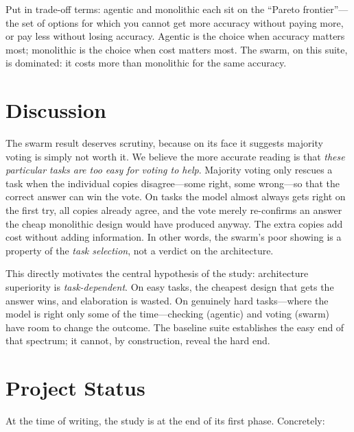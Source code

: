 \documentclass[sigconf,nonacm]{acmart}
\begin{document}
Put in trade-off terms: agentic and monolithic each sit on the ``Pareto
frontier''---the set of options for which you cannot get more accuracy without
paying more, or pay less without losing accuracy. Agentic is the choice when
accuracy matters most; monolithic is the choice when cost matters most. The swarm,
on this suite, is dominated: it costs more than monolithic for the same accuracy.

\section{Discussion}
\label{sec:discussion}

The swarm result deserves scrutiny, because on its face it suggests majority
voting is simply not worth it. We believe the more accurate reading is that
\emph{these particular tasks are too easy for voting to help}. Majority voting
only rescues a task when the individual copies disagree---some right, some
wrong---so that the correct answer can win the vote. On tasks the model almost
always gets right on the first try, all copies already agree, and the vote merely
re-confirms an answer the cheap monolithic design would have produced anyway. The
extra copies add cost without adding information. In other words, the swarm's poor
showing is a property of the \emph{task selection}, not a verdict on the
architecture.

This directly motivates the central hypothesis of the study: architecture
superiority is \emph{task-dependent}. On easy tasks, the cheapest design that
gets the answer wins, and elaboration is wasted. On genuinely hard tasks---where
the model is right only some of the time---checking (agentic) and voting (swarm)
have room to change the outcome. The baseline suite establishes the easy end of
that spectrum; it cannot, by construction, reveal the hard end.

\section{Project Status}
\label{sec:status}

At the time of writing, the study is at the end of its first phase. Concretely:
\end{document}
